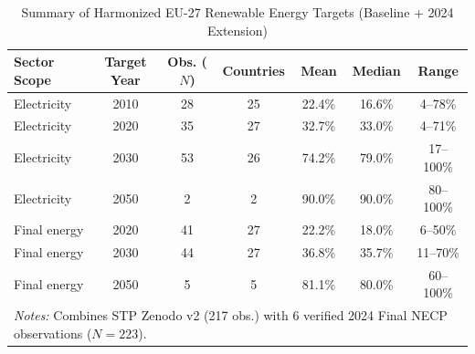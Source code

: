 \begin{table}[htbp]
\centering
\caption{Summary of Harmonized EU-27 Renewable Energy Targets (Baseline + 2024 Extension)}
\label{tab:summary_targets}
\small
\begin{tabular}{lcccccc}
\toprule
Sector Scope & Target Year & Obs. ($N$) & Countries & Mean & Median & Range \\
\midrule
Electricity & 2010 & 28 & 25 & 22.4\% & 16.6\% & 4--78\% \\
Electricity & 2020 & 35 & 27 & 32.7\% & 33.0\% & 4--71\% \\
Electricity & 2030 & 53 & 26 & 74.2\% & 79.0\% & 17--100\% \\
Electricity & 2050 & 2 & 2 & 90.0\% & 90.0\% & 80--100\% \\
Final energy & 2020 & 41 & 27 & 22.2\% & 18.0\% & 6--50\% \\
Final energy & 2030 & 44 & 27 & 36.8\% & 35.7\% & 11--70\% \\
Final energy & 2050 & 5 & 5 & 81.1\% & 80.0\% & 60--100\% \\
\bottomrule
\multicolumn{7}{l}{\footnotesize \textit{Notes:} Combines STP Zenodo v2 (217 obs.) with 6 verified 2024 Final NECP observations ($N=223$).} \\
\end{tabular}
\end{table}
